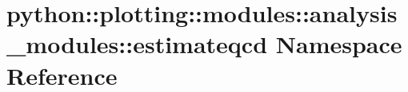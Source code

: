 \hypertarget{namespacepython_1_1plotting_1_1modules_1_1analysis__modules_1_1estimateqcd}{
\section{python::plotting::modules::analysis\_\-modules::estimateqcd Namespace Reference}
\label{namespacepython_1_1plotting_1_1modules_1_1analysis__modules_1_1estimateqcd}
}
